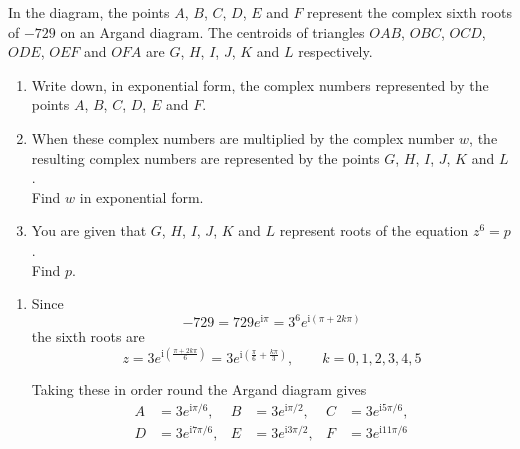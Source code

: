 \documentclass[leqno]{article}
\begin{document}
\begin{enumerate}[
  label=\textbf{\arabic*.},
  leftmargin=*,
  topsep=0pt,
  partopsep=0pt,
  parsep=0pt
]
\begin{figure}[H]
\end{figure}


In the diagram, the points $A$, $B$, $C$, $D$, $E$ and $F$ represent the complex sixth roots of $-729$ on an Argand diagram. The centroids of triangles $OAB$, $OBC$, $OCD$, $ODE$, $OEF$ and $OFA$ are $G$, $H$, $I$, $J$, $K$ and $L$ respectively. \\
\begin{enumerate}[label=\textbf{(\alph*)}]
  \item Write down, in exponential form, the complex numbers represented by the points $A$, $B$, $C$, $D$, $E$ and $F$.  \\
  \item When these complex numbers are multiplied by the complex number $w$, the resulting complex numbers are represented by the points $G$, $H$, $I$, $J$, $K$ and $L$. \\
  Find $w$ in exponential form.  \\
  \item You are given that $G$, $H$, $I$, $J$, $K$ and $L$ represent roots of the equation $z^6=p$. \\
  Find $p$.  \\
\end{enumerate}

\vspace*{30pt}

\begin{tcolorbox}[colback=white, colframe=scarlet, title={\textbf{Solution}}, breakable, grow to left by=6mm, grow to right by=10mm]
\begin{enumerate}[label=\textbf{(\alph*)}]
  \item Since
\[
-729=729e^{\mathrm{i}\pi}=3^6e^{\mathrm{i}(\pi+2k\pi)}
\]
the sixth roots are
\[
z=3e^{\mathrm{i}\left(\frac{\pi+2k\pi}{6}\right)}=3e^{\mathrm{i}\left(\frac{\pi}{6}+\frac{k\pi}{3}\right)},\qquad k=0,1,2,3,4,5
\]

Taking these in order round the Argand diagram gives
\begin{align*}
A&=3e^{\mathrm{i}\pi/6},&
B&=3e^{\mathrm{i}\pi/2},&
C&=3e^{\mathrm{i}5\pi/6},\\
D&=3e^{\mathrm{i}7\pi/6},&
E&=3e^{\mathrm{i}3\pi/2},&
F&=3e^{\mathrm{i}11\pi/6}
\end{align*}


\end{enumerate}
\end{tcolorbox}
\end{enumerate}
\end{document}
